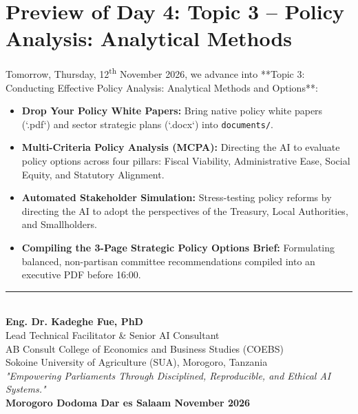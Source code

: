 \documentclass[11pt, a4paper]{report}
\begin{document}
\section{Preview of Day 4: Topic 3 -- Policy Analysis: Analytical Methods}
Tomorrow, Thursday, 12\textsuperscript{th} November 2026, we advance into **Topic 3: Conducting Effective Policy Analysis: Analytical Methods and Options**:
\begin{itemize}[label=-]
    \item \textbf{Drop Your Policy White Papers:} Bring native policy white papers (`.pdf`) and sector strategic plans (`.docx`) into \texttt{documents/}.
    \item \textbf{Multi-Criteria Policy Analysis (MCPA):} Directing the AI to evaluate policy options across four pillars: Fiscal Viability, Administrative Ease, Social Equity, and Statutory Alignment.
    \item \textbf{Automated Stakeholder Simulation:} Stress-testing policy reforms by directing the AI to adopt the perspectives of the Treasury, Local Authorities, and Smallholders.
    \item \textbf{Compiling the 3-Page Strategic Policy Options Brief:} Formulating balanced, non-partisan committee recommendations compiled into an executive PDF before 16:00.
\end{itemize}

\vspace{1.5cm}
\begin{center}
    \rule{0.65\textwidth}{0.4pt}\\[0.3cm]
    \textbf{\Large Eng. Dr. Kadeghe Fue, PhD}\\
    Lead Technical Facilitator \& Senior AI Consultant\\
    AB Consult \textbullet{} College of Economics and Business Studies (COEBS)\\
    Sokoine University of Agriculture (SUA), Morogoro, Tanzania\\[0.3cm]
    \small\textit{"Empowering Parliaments Through Disciplined, Reproducible, and Ethical AI Systems."}\\[0.5cm]
    \textbf{Morogoro \textbullet{} Dodoma \textbullet{} Dar es Salaam \textbullet{} November 2026}
\end{center}
\end{document}
